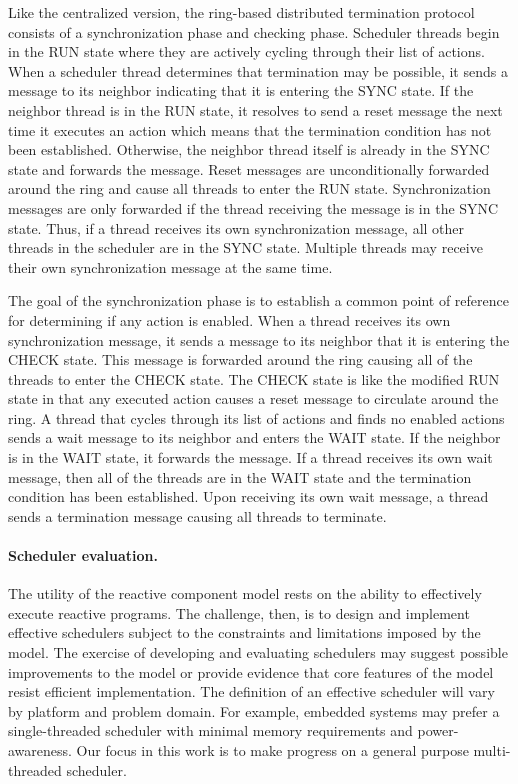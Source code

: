 Like the centralized version, the ring-based distributed termination protocol consists of a synchronization phase and checking phase.
Scheduler threads begin in the RUN state where they are actively cycling through their list of actions.
When a scheduler thread determines that termination may be possible, it sends a message to its neighbor indicating that it is entering the SYNC state.
If the neighbor thread is in the RUN state, it resolves to send a reset message the next time it executes an action which means that the termination condition has not been established.
Otherwise, the neighbor thread itself is already in the SYNC state and forwards the message.
Reset messages are unconditionally forwarded around the ring and cause all threads to enter the RUN state.
Synchronization messages are only forwarded if the thread receiving the message is in the SYNC state.
Thus, if a thread receives its own synchronization message, all other threads in the scheduler are in the SYNC state.
Multiple threads may receive their own synchronization message at the same time.

The goal of the synchronization phase is to establish a common point of reference for determining if any action is enabled.
When a thread receives its own synchronization message, it sends a message to its neighbor that it is entering the CHECK state.
This message is forwarded around the ring causing all of the threads to enter the CHECK state.
The CHECK state is like the modified RUN state in that any executed action causes a reset message to circulate around the ring.
A thread that cycles through its list of actions and finds no enabled actions sends a wait message to its neighbor and enters the WAIT state.
If the neighbor is in the WAIT state, it forwards the message.
If a thread receives its own wait message, then all of the threads are in the WAIT state and the termination condition has been established.
Upon receiving its own wait message, a thread sends a termination message causing all threads to terminate.

\paragraph{Scheduler evaluation.}
The utility of the reactive component model rests on the ability to effectively execute reactive programs.
The challenge, then, is to design and implement effective schedulers subject to the constraints and limitations imposed by the model.
The exercise of developing and evaluating schedulers may suggest possible improvements to the model or provide evidence that core features of the model resist efficient implementation.
The definition of an effective scheduler will vary by platform and problem domain.
For example, embedded systems may prefer a single-threaded scheduler with minimal memory requirements and power-awareness.
Our focus in this work is to make progress on a general purpose multi-threaded scheduler.

